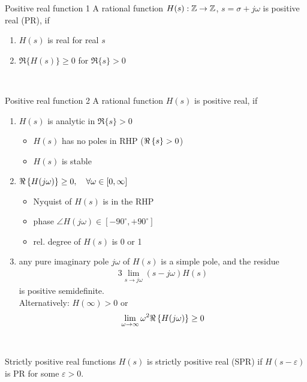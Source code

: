 \begin{definition}{Positive real function 1}
A rational function $H(s): \mathbb{Z} \rightarrow \mathbb{Z}$, $s = \sigma + j\omega$ is
positive real (PR), if
\begin{enumerate}[label=(\roman*)]
\item $H(s)$ is real for real $s$
\item  $\Re\{H(s)\} \geq 0$ for  $\Re\{s\} > 0$
\end{enumerate}
\end{definition}~

\begin{definition}{Positive real function 2}
A rational function $H(s)$ is positive real, if
\begin{enumerate}[label=(\roman*)]
\item $H(s)$ is analytic
 in $\Re\{s\} >0$ 
    \begin{itemize}
    \item $H(s)$ has no poles in RHP ($\Re \left\lbrace s \right\rbrace > 0$)
    \item $H(s)$ is stable
    \end{itemize}
\item $\Re \left\lbrace H(j\omega) \right\rbrace \geq 0, \quad \forall\omega \in [0, \infty]$    
    \begin{itemize}
        \item Nyquist of $H(s)$ is in the RHP
        \item phase $\angle H(j\omega) \in [-90^{\circ}, +90^{\circ}]$
        \item rel. degree of $H(s)$ is 0 or 1
    \end{itemize}
\item any pure imaginary pole $j\omega$ of $H(s)$ is
    a simple pole, and the residue
\begin{alignat*}{3}
\lim_{s \rightarrow j\omega} \left( s - j\omega \right) H(s)
\end{alignat*}
    is positive semidefinite.\\

    Alternatively: $H(\infty) > 0$ or 
 \begin{alignat*}{3}
\lim_{\omega \rightarrow \infty} \omega^2 \Re \left\lbrace H(j\omega) \right\rbrace \geq 0
\end{alignat*}
\end{enumerate}
\end{definition}~

\begin{definition}{Strictly positive real functions}
$H(s)$ is strictly positive real (SPR) if $H(s - \varepsilon)$ 
is PR for some $\varepsilon > 0$.
\end{definition}~

